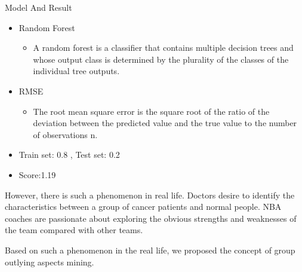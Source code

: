 \documentclass[
 size=12pt,
 paper=smartboard,  %
 mode=present, 		%
 display=slides, 	%
 style=tuliplab,  	%
 pauseslide,
 fleqn,leqno]{powerdot}
\begin{document}
\begin{slide}{Model And Result}
  \begin{itemize}
    \item
    Random Forest
    \begin{itemize}
      \item
      A random forest is a classifier that contains multiple decision trees and whose
output class is determined by the plurality of the classes of the individual tree
outputs.
    \end{itemize}
    \item
    RMSE
    \begin{itemize}
      \item
      The root mean square error is the square root of the ratio of the deviation
       between the predicted value and the true value to the number of observations n.
    \end{itemize}
    \item
    Train set: 0.8 , Test set: 0.2
    \item
    Score:1.19
  \end{itemize}
\begin{note}
However,
there is such a phenomenon in real life.
Doctors desire to identify the characteristics between
a group of cancer patients and normal people.
NBA coaches are passionate about exploring the obvious strengths and
weaknesses of the team compared with other teams.

Based on such a phenomenon in the real life,
we proposed the concept of group outlying aspects mining.
\end{note}
\end{slide}
\end{document}
